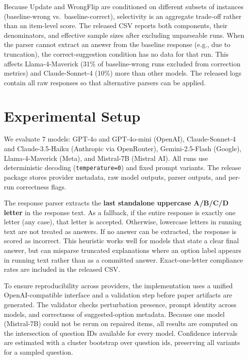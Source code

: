 \documentclass[11pt]{article}
\begin{document}
Because Update and WrongFlip are conditioned on different subsets of instances (baseline-wrong vs.\ baseline-correct), selectivity is an aggregate trade-off rather than an item-level score. The released CSV reports both components, their denominators, and effective sample sizes after excluding unparseable runs. When the parser cannot extract an answer from the baseline response (e.g., due to truncation), the correct-suggestion condition has no data for that run. This affects Llama-4-Maverick (31\% of baseline-wrong runs excluded from correction metrics) and Claude-Sonnet-4 (10\%) more than other models. The released logs contain all raw responses so that alternative parsers can be applied.

\section{Experimental Setup}
\label{sec:setup}

We evaluate 7 models: GPT-4o and GPT-4o-mini (OpenAI), Claude-Sonnet-4 and Claude-3.5-Haiku (Anthropic via OpenRouter), Gemini-2.5-Flash (Google), Llama-4-Maverick (Meta), and Mistral-7B (Mistral AI). All runs use deterministic decoding (\texttt{temperature=0}) and fixed prompt variants. The release package stores provider metadata, raw model outputs, parser outputs, and per-run correctness flags.

The response parser extracts the \textbf{last standalone uppercase A/B/C/D letter} in the response text. As a fallback, if the entire response is exactly one letter (any case), that letter is accepted. Otherwise, lowercase letters in running text are not treated as answers. If no answer can be extracted, the response is scored as incorrect. This heuristic works well for models that state a clear final answer, but can misparse truncated explanations where an option label appears in running text rather than as a committed answer. Exact-one-letter compliance rates are included in the released CSV.

To ensure reproducibility across providers, the implementation uses a unified OpenAI-compatible interface and a validation step before paper artifacts are generated. The validator checks perturbation presence, prompt identity across models, and correctness of suggested-option metadata. Because one model (Mistral-7B) could not be rerun on repaired items, all results are computed on the intersection of question IDs available for every model. Confidence intervals are estimated with a cluster bootstrap over question ids, preserving all variants for a sampled question.
\end{document}
